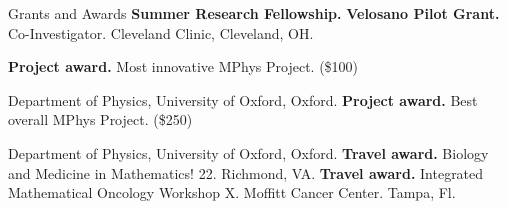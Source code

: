 \begin{rubric}{Grants and Awards}
\entry*[2014-15] \textbf{Summer Research Fellowship.}  
\entry*[2021-22] \textbf{Velosano Pilot Grant.} Co-Investigator. Cleveland Clinic, Cleveland, OH. 

\entry*[2015] \textbf{Project award.} Most innovative MPhys Project. (\$100)
\par Department of Physics, University of Oxford, Oxford. 
\entry*[2015] \textbf{Project award.} Best overall MPhys Project. (\$250)
\par Department of Physics, University of Oxford, Oxford. 
\entry*[2022] \textbf{Travel award.} Biology and Medicine in Mathematics! 22. Richmond, VA. 
\entry*[2022] \textbf{Travel award.} Integrated Mathematical Oncology Workshop X. Moffitt Cancer Center. Tampa, Fl. 

\end{rubric}